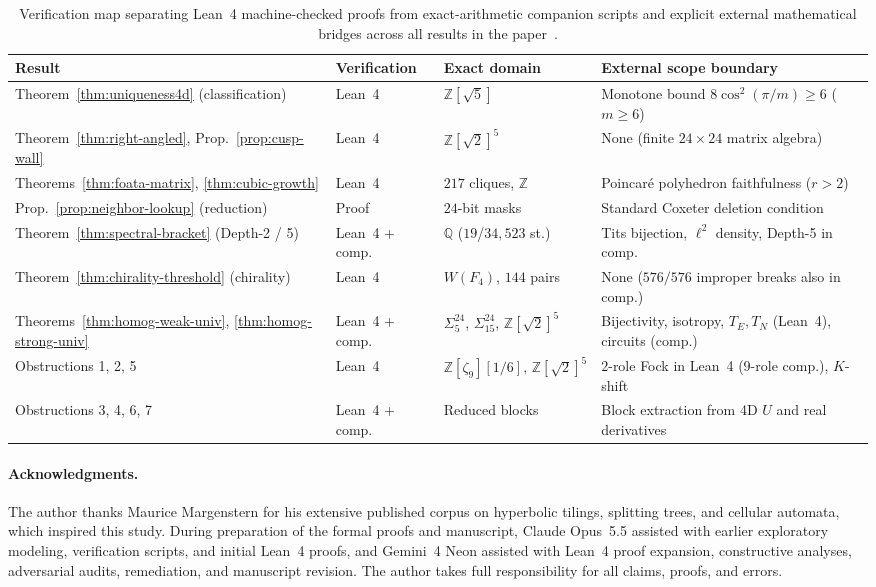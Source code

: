 \begin{table}[tb]
\centering
\caption{Verification map separating Lean~4 machine-checked proofs from exact-arithmetic companion scripts and explicit external mathematical bridges across all results in the paper~\cite{pollard2026repo}.}
\label{tab:verification-map}
\footnotesize
\setlength{\tabcolsep}{4pt}
\begin{tabularx}{\textwidth}{@{}lllX@{}}
\toprule
Result & Verification & Exact domain & External scope boundary \\
\midrule
Theorem~\ref{thm:uniqueness4d} (classification) & Lean~4 & $\mathbb{Z}[\sqrt{5}]$ & Monotone bound $8\cos^2(\pi/m) \ge 6$ ($m \ge 6$) \\
Theorem~\ref{thm:right-angled}, Prop.~\ref{prop:cusp-wall} & Lean~4 & $\mathbb{Z}[\sqrt{2}]^5$ & None (finite $24 \times 24$ matrix algebra) \\
Theorems~\ref{thm:foata-matrix}, \ref{thm:cubic-growth} & Lean~4 & $217$ cliques, $\mathbb{Z}$ & Poincar\'e polyhedron faithfulness ($r > 2$) \\
Prop.~\ref{prop:neighbor-lookup} (reduction) & Proof & $24$-bit masks & Standard Coxeter deletion condition \\
Theorem~\ref{thm:spectral-bracket} (Depth-2 / 5) & Lean~4 + comp. & $\mathbb{Q}$ ($19$/$34{,}523$ st.) & Tits bijection, $\ell^2$ density, Depth-5 in comp. \\
Theorem~\ref{thm:chirality-threshold} (chirality) & Lean~4 & $W(F_4)$, $144$ pairs & None ($576/576$ improper breaks also in comp.) \\
Theorems~\ref{thm:homog-weak-univ}, \ref{thm:homog-strong-univ} & Lean~4 + comp. & $\Sigma_5^{24}$, $\Sigma_{15}^{24}$, $\mathbb{Z}[\sqrt{2}]^5$ & Bijectivity, isotropy, $T_E, T_N$ (Lean~4), circuits (comp.) \\
Obstructions 1, 2, 5 & Lean~4 & $\mathbb{Z}[\zeta_9][1/6],\,\mathbb{Z}[\sqrt{2}]^5$ & $2$-role Fock in Lean~4 ($9$-role comp.), $K$-shift \\
Obstructions 3, 4, 6, 7 & Lean~4 + comp. & Reduced blocks & Block extraction from 4D $U$ and real derivatives \\
\bottomrule
\end{tabularx}
\end{table}

\paragraph{Acknowledgments.}
The author thanks Maurice Margenstern for his extensive published corpus on hyperbolic tilings, splitting trees, and cellular automata, which inspired this study. During preparation of the formal proofs and manuscript, Claude Opus~5.5 assisted with earlier exploratory modeling, verification scripts, and initial Lean~4 proofs, and Gemini~4 Neon assisted with Lean~4 proof expansion, constructive analyses, adversarial audits, remediation, and manuscript revision. The author takes full responsibility for all claims, proofs, and errors.
